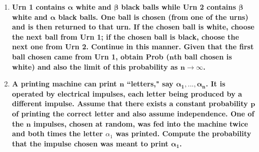 \documentclass[10pt, oneside]{article}   	%
\theoremstyle{definition}
\begin{document}
\begin{enumerate}[label=3.\arabic*]
\item  \begin{tcolorbox}[
  colback=Cerulean!5!white,
  colframe=Cerulean!75!black]
\textbf{Urn 1 contains $\bm{\alpha}$ white and $\bm{\beta}$ black balls while Urn 2 contains $\bm{\beta}$ white and $\bm{\alpha}$ black balls. One ball is chosen (from one of the urns) and is then returned to that urn. If the chosen ball is white, choose the next ball from Urn 1; if the chosen ball is black, choose the next one from Urn 2. Continue in this manner. Given that the first ball chosen came from Urn 1, obtain Prob ($\bm{n}$th ball chosen is white) and also the limit of this probability as $\bm{n \rightarrow \infty}$.}
\end{tcolorbox}

\item  \begin{tcolorbox}[
  colback=Cerulean!5!white,
  colframe=Cerulean!75!black]
\textbf{A printing machine can print $\bm{n}$ ``letters," say $\bm{\alpha_1, ..., \alpha_n}$. It is operated by electrical impulses, each letter being produced by a different impulse. Assume that there exists a constant probability $\bm{p}$ of printing the correct letter and also assume independence. One of the $\bm{n}$ impulses, chosen at random, was fed into the machine twice and both times the letter $\alpha_1$ was printed. Compute the probability that the impulse chosen was meant to print $\bm{\alpha_1}$.}
\end{tcolorbox}

\end{enumerate}
\end{document}
